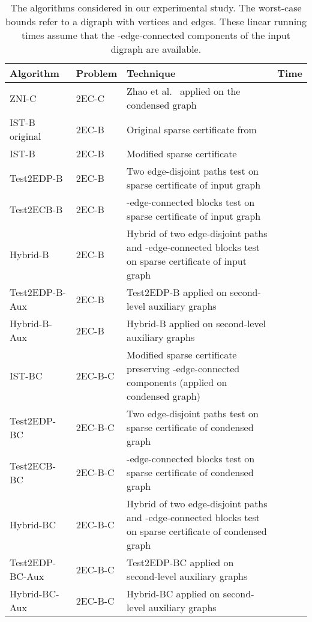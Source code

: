 \documentclass[11pt]{article}
\begin{document}
\begin{table}[!ht]
\begin{adjustbox}{width=\textwidth,totalheight=\textheight,keepaspectratio}
\begin{small}
\tabulinesep=1.0mm
\setlength{\tabcolsep}{4.0pt} \begin{tabu}[t]{p{2.78cm}p{1.32cm}p{8.2cm}p{1.50cm}} \hline
  Algorithm & Problem & Technique & Time \\
 \hline
 \textsf{ZNI-C}  & \textsf{2EC-C}  & Zhao et al.~\cite{ZNI:MSCS:2003} applied on the  condensed graph  &   \\
 \hline
  \textsf{IST-B original}  & \textsf{2EC-B}  & Original sparse certificate from \cite{2ECB}  &   \\
  \textsf{IST-B}                   & \textsf{2EC-B} &  Modified sparse certificate &   \\
  \textsf{Test2EDP-B}             & \textsf{2EC-B} & Two edge-disjoint paths test on sparse certificate of input graph &  \\
  \textsf{Test2ECB-B}             & \textsf{2EC-B} & -edge-connected blocks test on sparse certificate of input graph &  \\
  \textsf{Hybrid-B}                   & \textsf{2EC-B} & Hybrid of two edge-disjoint paths and -edge-connected blocks test on sparse certificate of input graph &  \\
   \textsf{Test2EDP-B-Aux}             & \textsf{2EC-B} & \textsf{Test2EDP-B} applied on second-level auxiliary graphs &  \\
   \textsf{Hybrid-B-Aux}                   & \textsf{2EC-B} & \textsf{Hybrid-B} applied on second-level auxiliary graphs &  \\
  \hline
  \textsf{IST-BC}                   & \textsf{2EC-B-C} &  Modified sparse certificate preserving -edge-connected components (applied on condensed graph) &   \\
  \textsf{Test2EDP-BC}             & \textsf{2EC-B-C} & Two edge-disjoint paths test on sparse certificate of condensed graph &  \\
   \textsf{Test2ECB-BC}             & \textsf{2EC-B-C} & -edge-connected blocks test on sparse certificate of condensed graph &  \\
  \textsf{Hybrid-BC}                   & \textsf{2EC-B-C} & Hybrid of two edge-disjoint paths and -edge-connected blocks test on sparse certificate of condensed graph &  \\
   \textsf{Test2EDP-BC-Aux}             & \textsf{2EC-B-C} & \textsf{Test2EDP-BC} applied on second-level auxiliary graphs &  \\
   \textsf{Hybrid-BC-Aux}                   & \textsf{2EC-B-C} & \textsf{Hybrid-BC} applied on second-level auxiliary graphs &  \\
  \hline
  \end{tabu}
\end{small}
\end{adjustbox}
\caption{The algorithms considered in our experimental study. The
worst-case bounds refer to a digraph with  vertices and 
edges. These linear running times assume that the -edge-connected components of the input digraph are available.}
\label{tab:algorithms}
\end{table}
\end{document}
